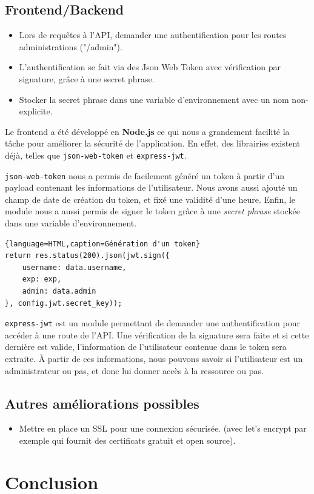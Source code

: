 \documentclass[a4paper]{article}
\begin{document}
\subsection{Frontend/Backend}
\begin{itemize}
\item Lors de requêtes à l'API, demander une authentification pour les routes administrations ("/admin").
\item L'authentification se fait via des Json Web Token avec vérification par signature, grâce à une secret phrase.
\item Stocker la secret phrase dans une variable d'environnement avec un nom non-explicite.
\end{itemize}

Le frontend a été développé en \textbf{Node.js} ce qui nous a grandement facilité la tâche pour améliorer la sécurité de l'application. En effet, des librairies existent déjà, telles que \texttt{json-web-token} et \texttt{express-jwt}.

\texttt{json-web-token} nous a permis de facilement généré un token à partir d'un payload contenant les informations de l'utilisateur. Nous avons aussi ajouté un champ de date de création du token, et fixé une validité d'une heure. Enfin, le module nous a aussi permis de signer le token grâce à une \textit{secret phrase} stockée dans une variable d'environnement.

\begin{lstlisting}{language=HTML,caption=Génération d'un token}
return res.status(200).json(jwt.sign({
	username: data.username,
	exp: exp,
	admin: data.admin
}, config.jwt.secret_key));
\end{lstlisting}

\texttt{express-jwt} est un module permettant de demander une authentification pour accéder à une route de l'API. Une vérification de la signature sera faite et si cette dernière est valide, l'information de l'utilisateur contenue dans le token sera extraite. À partir de ces informations, nous pouvons savoir si l'utilisateur est un administrateur ou pas, et donc lui donner accès à la ressource ou pas.

\subsection{Autres améliorations possibles}
\begin{itemize}
\item Mettre en place un SSL pour une connexion sécurisée. (avec let's encrypt par exemple qui fournit des certificats gratuit et open source).
\end{itemize}
\section{Conclusion}
\end{document}
